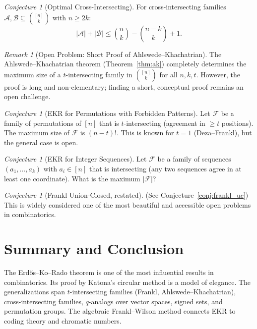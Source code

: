 \documentclass[12pt,a4paper]{amsart}
\theoremstyle{definition}
\theoremstyle{remark}
\newtheorem{remark}[theorem]{Remark}
\newtheorem{conjecture}[theorem]{Conjecture}
\begin{document}
\begin{conjecture}[Optimal Cross-Intersecting]\label{conj:cross_opt}
For cross-intersecting families $\mathcal{A}, \mathcal{B} \subseteq \binom{[n]}{k}$
with $n \geq 2k$:
\[
  |\mathcal{A}| + |\mathcal{B}| \leq \binom{n}{k} - \binom{n-k}{k} + 1.
\]
\end{conjecture}

\begin{remark}[Open Problem: Short Proof of Ahlswede--Khachatrian]\label{rem:t_small_n}
The Ahlswede--Khachatrian theorem (Theorem~\ref{thm:ak}) completely determines the
maximum size of a $t$-intersecting family in $\binom{[n]}{k}$ for all $n, k, t$.
However, the proof is long and non-elementary; finding a short, conceptual proof
remains an open challenge.
\end{remark}

\begin{conjecture}[EKR for Permutations with Forbidden Patterns]\label{conj:ekr_perm}
Let $\mathcal{F}$ be a family of permutations of $[n]$ that is $t$-intersecting
(agreement in $\geq t$ positions). The maximum size of $\mathcal{F}$ is
$(n-t)!$. This is known for $t = 1$ (Deza--Frankl), but the general case is open.
\end{conjecture}

\begin{conjecture}[EKR for Integer Sequences]\label{conj:ekr_int}
Let $\mathcal{F}$ be a family of sequences $(a_1, \ldots, a_k)$ with $a_i \in [n]$
that is intersecting (any two sequences agree in at least one coordinate). What is
the maximum $|\mathcal{F}|$?
\end{conjecture}

\begin{conjecture}[Frankl Union-Closed, restated]\label{conj:frankl_uc2}
(See Conjecture~\ref{conj:frankl_uc}) This is widely considered one of the most
beautiful and accessible open problems in combinatorics.
\end{conjecture}

\section{Summary and Conclusion}

The Erdős--Ko--Rado theorem is one of the most influential results in combinatorics.
Its proof by Katona's circular method is a model of elegance. The generalizations
span $t$-intersecting families (Frankl, Ahlswede--Khachatrian), cross-intersecting
families, $q$-analogs over vector spaces, signed sets, and permutation groups. The
algebraic Frankl--Wilson method connects EKR to coding theory and chromatic numbers.
\end{document}
